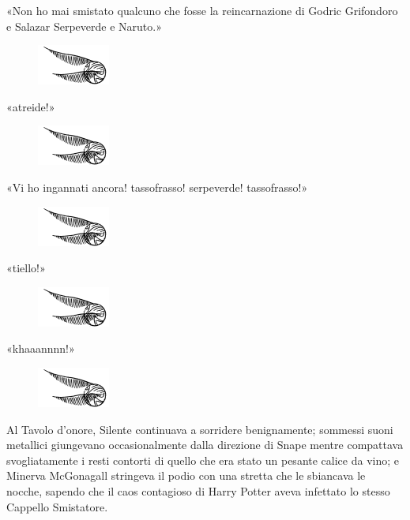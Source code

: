 «Non ho mai smistato qualcuno che fosse la reincarnazione di Godric Grifondoro e Salazar Serpeverde e Naruto.»

\begin{figure}[h!]
	\includegraphics[scale=0.4]{boccino.png}
	\centering
\end{figure}

«atreide!»

\begin{figure}[h!]
	\includegraphics[scale=0.4]{boccino.png}
	\centering
\end{figure}

«Vi ho ingannati ancora! tassofrasso! serpeverde! tassofrasso!»

\begin{figure}[h!]
	\includegraphics[scale=0.4]{boccino.png}
	\centering
\end{figure}

«tiello!»

\begin{figure}[h!]
	\includegraphics[scale=0.4]{boccino.png}
	\centering
\end{figure}

«khaaannnn!»

\begin{figure}[h!]
	\includegraphics[scale=0.4]{boccino.png}
	\centering
\end{figure}

Al Tavolo d’onore, Silente continuava a sorridere benignamente; sommessi suoni metallici giungevano occasionalmente dalla direzione di Snape mentre compattava svogliatamente i resti contorti di quello che era stato un pesante calice da vino; e Minerva McGonagall stringeva il podio con una stretta che le sbiancava le nocche, sapendo che il caos contagioso di Harry Potter aveva infettato lo stesso Cappello Smistatore.

